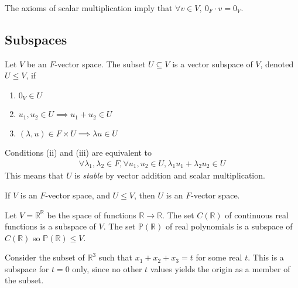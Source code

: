    \begin{remark}
        The axioms of scalar multiplication imply that $\forall v \in V,\ 0_F \cdot v = 0_V$.
    \end{remark}

    \subsection{Subspaces}
    \begin{definition}[Subspace]
        Let $V$ be an $F$-vector space.
        The subset $U \subseteq V$ is a vector subspace of $V$, denoted $U \leq V$, if
        \begin{enumerate}
            \item $0_V \in U$
            \item $u_1, u_2 \in U \implies u_1 + u_2 \in U$
            \item $(\lambda, u) \in F \times U \implies \lambda u \in U$
        \end{enumerate}
        Conditions (ii) and (iii) are equivalent to
        \begin{align*}
            \forall \lambda_1, \lambda_2 \in F, \forall u_1, u_2 \in U, \lambda_1 u_1 + \lambda_2 u_2 \in U
        \end{align*}
        This means that $U$ is \textit{stable} by vector addition and scalar multiplication.
    \end{definition}

    \begin{proposition}
        If $V$ is an $F$-vector space, and $U \leq V$, then $U$ is an $F$-vector space.
    \end{proposition}

    \begin{example}
        Let $V = \mathbb R^{\mathbb R}$ be the space of functions $\mathbb R \to \mathbb R$.
        The set $C(\mathbb R)$ of continuous real functions is a subspace of $V$.
        The set $\mathbb P(\mathbb{R})$ of real polynomials is a subspace of $C(\mathbb R)$ so $\mathbb{P}(\mathbb{R}) \leq V$.
    \end{example}
    \begin{example}
        Consider the subset of $\mathbb R^3$ such that $x_1 + x_2 + x_3 = t$ for some real $t$.
        This is a subspace for $t = 0$ only, since no other $t$ values yields the origin as a member of the subset.
    \end{example}


